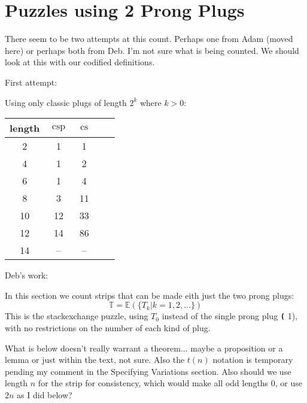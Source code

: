 \documentclass[10pt]{article}
\numberwithin{equation}{section}
\DeclareMathOperator{\cs}{cs} %
\DeclareMathOperator{\csp}{csp} %
\newenvironment{anote}
               {{\textcolor{blue}{Note:}}
                 \itshape
               }
               {}
\newcommand{\plug}[1]{%
\mbox{{\textbf\texttt #1}}
}
\newcommand{\puzzle}{%
   \ensuremath{
   \mathbb{E}
   }
}
\begin{document}
\section{Puzzles using 2 Prong Plugs}

\begin{anote}
There seem to be two attempts at this count. Perhaps one from Adam (moved here) or perhaps both from Deb. I'm not sure what is being counted. We should look at this with our codified definitions.

First attempt:
\end{anote}

   Using only classic plugs of length $2^k$ where $k>0$:
        \begin{center}
        \begin{tabular}{ |c|c|c|c|c| } 
         \hline
         length & $\csp$ & $\cs$ \\ 
         \hline
        2 & 1 & 1\\
        4 & 1 & 2\\
        6 & 1 & 4\\
        8 & 3 & 11\\
        10 & 12 & 33\\
        12 & 14 & 86\\
        14 & -- & --\\
         \hline
        \end{tabular}
        \end{center}
        
\begin{anote}
Deb's work:
\end{anote}

In this section we count strips that can be made eith just the two prong plugs:
\begin{equation*}
    \mathbb{T} = \puzzle(\{T_k | k = 1, 2, \ldots\})
\end{equation*}
This is the stackexchange puzzle, using $T_0$ instead of the single prong plug \plug(1), with no restrictions on the number of each kind of plug.

\begin{anote}
What is below doesn't really warrant a theorem... maybe a proposition or a lemma or just within the text, not sure. Also the $t(n)$ notation is temporary pending my comment in the Specifying Variations section. Also should we use length $n$ for the strip for consistency, which would make all odd lengths 0, or use $2n$ as I did below?
\end{anote}
\end{document}
